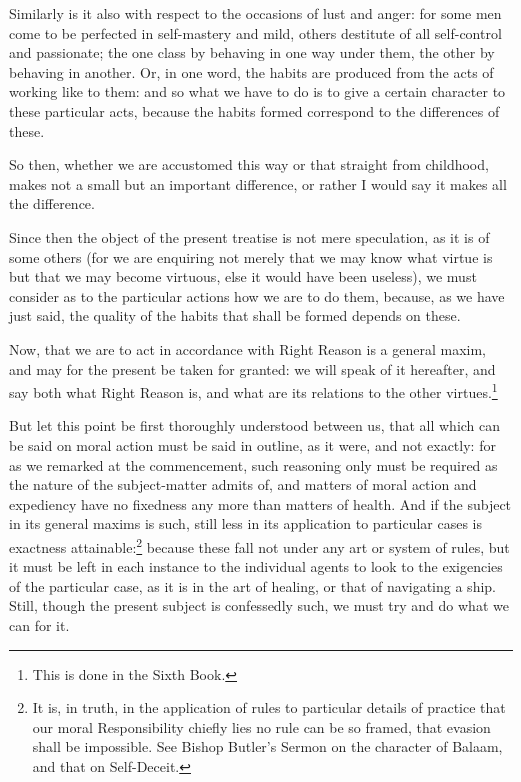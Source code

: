 Similarly is it also with respect to the occasions of lust and anger: for some
men come to be perfected in self-mastery and mild, others destitute of all
self-control and passionate; the one class by behaving in one way under them,
the other by behaving in another. Or, in one word, the habits are produced from
the acts of working like to them: and so what we have to do is to give a
certain character to these particular acts, because the habits formed
correspond to the differences of these.

So then, whether we are accustomed this way or that straight from childhood,
makes not a small but an important difference, or rather I would say it makes
all the difference.


Since then the object of the present treatise is not mere speculation, as it is
of some others (for we are enquiring not merely that we may know what virtue is
but that we may become virtuous, else it would have been useless), we must
consider as to the particular actions how we are to do them, because, as we
have just said, the quality of the habits that shall be formed depends on
these.

Now, that we are to act in accordance with Right Reason is a general maxim, and
may for the present be taken for granted: we will speak of it hereafter, and
say both what Right Reason is, and what are its relations to the other
virtues.\footnote{This is done in the Sixth Book.}

But let this point be first thoroughly understood between us, that all which
can be said on moral action must be said in outline, as it were, and not
exactly: for as we remarked at the commencement, such reasoning only must be
required as the nature of the subject-matter admits of, and matters of moral
action and expediency have no fixedness any more than matters of health. And if
the subject in its general maxims is such, still less in its application to
particular cases is exactness attainable:\footnote{It is, in truth, in the application of rules to particular details of practice
that our moral Responsibility chiefly lies no rule can be so framed, that
evasion shall be impossible. See Bishop Butler’s Sermon on the character
of Balaam, and that on Self-Deceit.}
because these fall not under any art or system of rules, but it must be left in
each instance to the individual agents to look to the exigencies of the
particular case, as it is in the art of healing, or that of navigating a ship.
Still, though the present subject is confessedly such, we must try and do what
we can for it.

